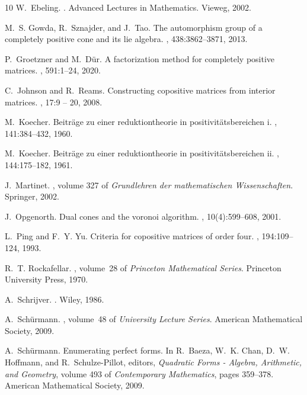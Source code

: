 \documentclass{commat}
\begin{document}
{\begin{thebibliography}{10}
W.~Ebeling.
.
\newblock Advanced Lectures in Mathematics. Vieweg, 2002.

M.~S. Gowda, R.~Sznajder, and J.~Tao.
\newblock The automorphism group of a completely positive cone and its lie
  algebra.
, 438:3862--3871, 2013.

P.~Groetzner and M.~Dür.
\newblock A factorization method for completely positive matrices.
, 591:1--24, 2020.

C.~Johnson and R.~Reams.
\newblock Constructing copositive matrices from interior matrices.
, 17:9 -- 20, 2008.

M.~Koecher.
\newblock Beiträge zu einer reduktiontheorie in positivitätsbereichen i.
, 141:384--432, 1960.

M.~Koecher.
\newblock Beiträge zu einer reduktiontheorie in positivitätsbereichen ii.
, 144:175--182, 1961.

J.~Martinet.
, volume 327 of {\em
  Grundlehren der mathematischen Wissenschaften}.
\newblock Springer, 2002.

J.~Opgenorth.
\newblock Dual cones and the voronoi algorithm.
, 10(4):599--608, 2001.

L.~Ping and F.~Y. Yu.
\newblock Criteria for copositive matrices of order four.
, 194:109--124, 1993.

R.~T. Rockafellar.
, volume~28 of {\em Princeton Mathematical
  Series}.
\newblock Princeton University Press, 1970.

A.~Schrijver.
.
\newblock Wiley, 1986.

A.~Schürmann.
,
  volume~48 of {\em University Lecture Series}.
\newblock American Mathematical Society, 2009.

A.~Schürmann.
\newblock Enumerating perfect forms.
\newblock In R.~Baeza, W.~K. Chan, D.~W. Hoffmann, and R.~Schulze-Pillot,
  editors, {\em Quadratic Forms - Algebra, Arithmetic, and Geometry}, volume
  493 of {\em Contemporary Mathematics}, pages 359--378. American Mathematical
  Society, 2009.


\end{thebibliography}}
\end{document}
